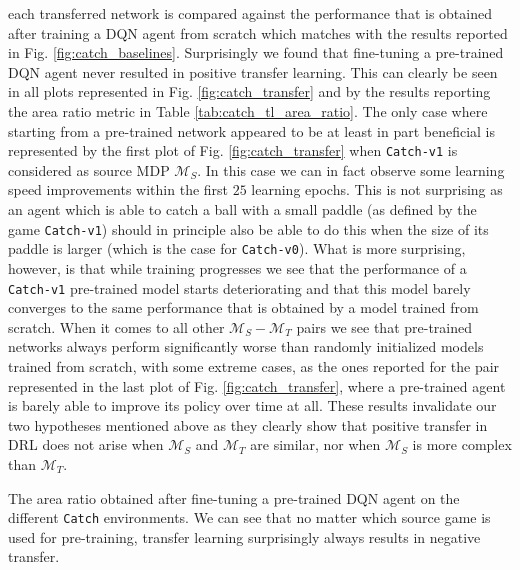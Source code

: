 each transferred network is compared against the performance that is obtained after training a DQN agent from scratch which matches with the results reported in Fig. \ref{fig:catch_baselines}.
Surprisingly we found that fine-tuning a pre-trained DQN agent never resulted in positive transfer learning. This can clearly be seen in all plots represented in Fig. \ref{fig:catch_transfer} and by the results reporting the area ratio metric in Table \ref{tab:catch_tl_area_ratio}. The only case where starting from a pre-trained network appeared to be at least in part beneficial is represented by the first plot of Fig. \ref{fig:catch_transfer} when \texttt{Catch-v1} is considered as source MDP $\mathcal{M}_S$. In this case we can in fact observe some learning speed improvements within the first $25$ learning epochs. This is not surprising as an agent which is able to catch a ball with a small paddle (as defined by the game \texttt{Catch-v1}) should in principle also be able to do this when the size of its paddle is larger (which is the case for \texttt{Catch-v0}). What is more surprising, however, is that while training progresses we see that the performance of a \texttt{Catch-v1} pre-trained model starts deteriorating and that this model barely converges to the same performance that is obtained by a model trained from scratch. When it comes to all other $\mathcal{M}_S-\mathcal{M}_T$ pairs we see that pre-trained networks always perform significantly worse than randomly initialized models trained from scratch, with some extreme cases, as the ones reported for the pair represented in the last plot of Fig. \ref{fig:catch_transfer}, where a pre-trained agent is barely able to improve its policy over time at all. These results invalidate our two hypotheses mentioned above as they clearly show that positive transfer in DRL does not arise when $\mathcal{M}_S$ and $\mathcal{M}_T$ are similar, nor when $\mathcal{M}_S$ is more complex than $\mathcal{M}_T$. 



\begin{table}
	\centering
	\caption{The area ratio obtained after fine-tuning a pre-trained DQN agent on the different \texttt{Catch} environments. We can see that no matter which source game is used for pre-training, transfer learning surprisingly always results in negative transfer.}
	
	\label{tab:catch_tl_area_ratio}
\end{table}


